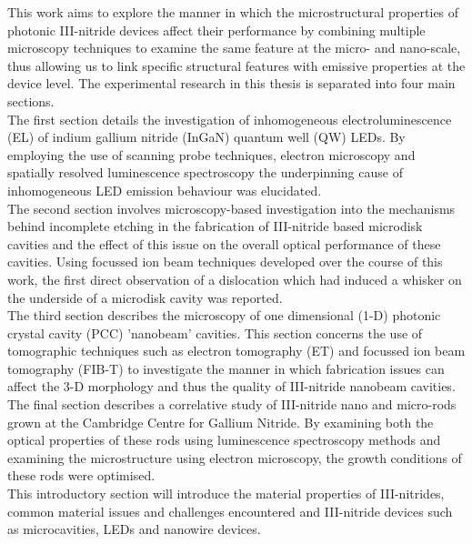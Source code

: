 This work aims to explore the manner in which the microstructural properties of photonic III-nitride devices affect their performance by combining multiple microscopy techniques to examine the same feature at the micro- and nano-scale, thus allowing us to link specific structural features with emissive properties at the device level. The experimental research in this thesis is separated into four main sections. 
\\The first section details the investigation of inhomogeneous electroluminescence  (EL) of indium gallium nitride (InGaN) quantum well (QW) LEDs. By employing the use of scanning probe techniques, electron microscopy and spatially resolved luminescence spectroscopy the underpinning cause of inhomogeneous LED emission behaviour was elucidated.
\\The second section involves microscopy-based investigation into the mechanisms behind incomplete etching in the fabrication of III-nitride based microdisk cavities and the effect of this issue on the overall optical performance of these cavities. Using focussed ion beam techniques developed over the course of this work, the first direct observation of a dislocation which had induced a whisker on the underside of a microdisk cavity was reported.
\\The third section describes the microscopy of one dimensional  (1-D) photonic crystal cavity (PCC) 'nanobeam' cavities. This section concerns the use of tomographic techniques such as electron tomography  (ET) and focussed ion beam tomography  (FIB-T) to investigate the manner in which fabrication issues can affect the 3-D morphology and thus the quality of III-nitride nanobeam cavities.
\\ The final section describes a correlative study of III-nitride nano and micro-rods grown at the Cambridge Centre for Gallium Nitride. By examining both the optical properties of these rods using luminescence spectroscopy methods and examining the microstructure using electron microscopy, the growth conditions of these rods were optimised.
\\ This introductory section will introduce the material properties of III-nitrides, common material issues and challenges encountered and III-nitride devices such as microcavities, LEDs and nanowire devices.

